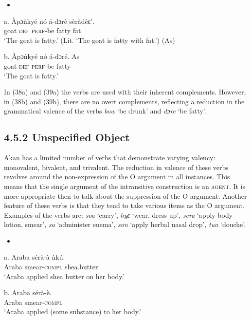 \documentclass[output=paper]{langsci/langscibook}
\begin{document}
\begin{itemize}
\item \end{itemize}
\gll a.  \`{A}pɔ\`{n}ky\'{e}  n\'{o}  \'{a}-dɔr\`{e}      s\`{e}r\`{a}d\'{e}ԑ\'{ }.\\
       goat    \textsc{def}  \textsc{perf}{}-be fatty    fat\\
\glt   ‘The goat is fatty.’ (Lit. ‘The goat is fatty with fat.’) (As)
\z

\gll  b.  \`{A}pɔ\`{n}ky\'{e}  n\'{o}  \'{a}-dɔr\'{e}.      As\\
       goat    \textsc{def}  \textsc{perf}{}-be fatty  \\
\glt   ‘The goat is fatty.’
\z

In (38a) and (39a) the verbs are used with their inherent complements. However, in (38b) and (39b), there are no overt complements, reflecting a reduction in the grammatical valence of the verbs \emph{bow} ‘be drunk’ and \emph{dɔre} ‘be fatty’.

\subsection{4.5.2  Unspecified Object}

Akan has a limited number of verbs that demonstrate varying valency: monovalent, bivalent, and trivalent. The reduction in valence of these verbs revolves around the non-expression of the O argument in all instances. This means that the single argument of the intransitive construction is an \textsc{agent}. It is more appropriate then to talk about the suppression of the O argument. Another feature of these verbs is that they tend to take various items as the O argument. Examples of the verbs are: \emph{soa} ‘carry’, \emph{hyɛ} ‘wear, dress up’, \emph{sera} ‘apply body lotion, smear’, \emph{sa} ‘administer enema’, \emph{son} ‘apply herbal nasal drop’, \emph{tua} ‘douche’.

\begin{itemize}
\item \end{itemize}
\gll a.  Araba  s\'{e}r\`{a}-\`{a}    \`{n}k\'{u}.\\
       Araba  smear-\textsc{compl}  shea.butter\\
\glt ‘Araba applied shea butter on her body.’
\z

\gll  b.  Araba  s\'{e}r\`{a}-\`{e}.\\
       Araba  smear-\textsc{compl}\\
\glt ‘Araba applied (some substance) to her body.’
\z
\end{document}
